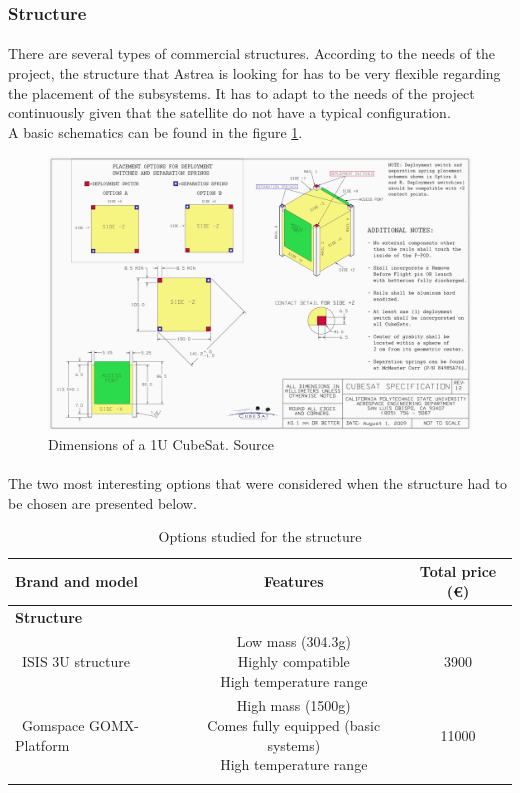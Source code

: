 \subsubsection{Structure}\label{Appendix:Structure}
\paragraph{}There are several types of commercial structures. According to the needs of the project, the structure that Astrea is looking for has to be very flexible regarding the placement of the subsystems. It has to adapt to the needs of the project continuously given that the satellite do not have a typical configuration.\\
A basic schematics can be found in the figure \ref{epsschematics}.

\begin{figure}[h!]
\includegraphics[scale=0.6]{./ANNEXES/images/CubeSatDesign}
\centering
\caption{Dimensions of a 1U CubeSat. Source \cite{cubesatdimensions}}
\label{epsschematics}
\end{figure}

\paragraph{}The two most interesting options that were considered when the structure had to be chosen are presented below.

\begin{longtable}{| l | c | c | }
\hline
\rowcolor[gray]{0.80}	\textbf{Brand and model} &  \textbf{Features}     & \textbf{Total price (\euro)}   \\
\hline
\endfirsthead

\rowcolor[gray]{0.85} \textbf{Structure} &  &  \\
	   ~ISIS 3U structure & \makecell{Low mass (304.3g) \\ Highly compatible \\ High temperature range} & 3900 \\
	   \hline
	   ~Gomspace GOMX-Platform & \makecell{High mass (1500g) \\ Comes fully equipped (basic systems) \\ High temperature range} & 11000 \\
	   \hline
\caption{Options studied for the structure}
\label{structureoptions}
\end{longtable}

